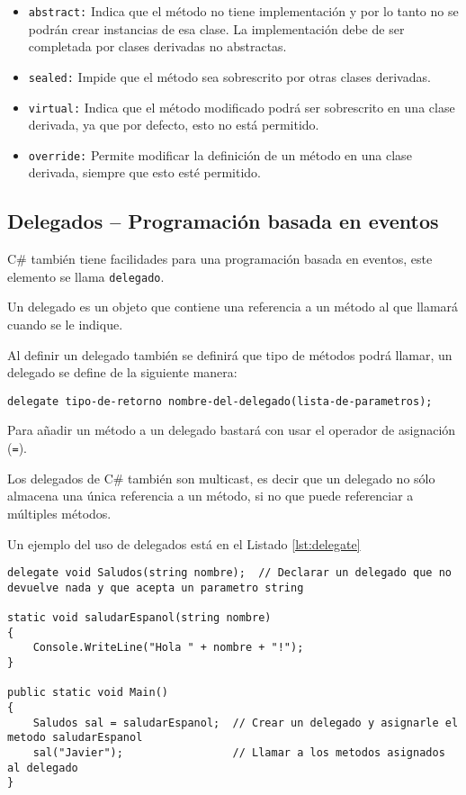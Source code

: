 \documentclass{pre-tfg}
\begin{document}
\begin{itemize}
	\item \texttt{abstract:} Indica que el método no tiene implementación y por lo tanto no se podrán crear instancias de esa clase. La implementación debe de ser completada por clases derivadas no abstractas.
	\item \texttt{sealed:} Impide que el método sea sobrescrito por otras clases derivadas.
	\item \texttt{virtual:} Indica que el método modificado podrá ser sobrescrito en una clase derivada, ya que por defecto, esto no está permitido.
	\item \texttt{override:} Permite modificar la definición de un método en una clase derivada, siempre que esto esté permitido.
\end{itemize}



\subsection{Delegados -- Programación basada en eventos}

C\# también tiene facilidades para una programación basada en eventos, este elemento se llama \texttt{delegado}.

Un delegado es un objeto que contiene una referencia a un método al que llamará cuando se le indique.

Al definir un delegado también se definirá que tipo de métodos podrá llamar, un delegado se define de la siguiente manera:

\begin{spacing}{1}
\begin{lstlisting}[float=htbp, caption=Estructura de un delegado]
delegate tipo-de-retorno nombre-del-delegado(lista-de-parametros);
\end{lstlisting}
\end{spacing}

Para añadir un método a un delegado bastará con usar el operador de asignación (\texttt{=}).

Los delegados de C\# también son multicast, es decir que un delegado no sólo almacena una única referencia a un método, si no que puede referenciar a múltiples métodos.

Un ejemplo del uso de delegados está en el Listado \ref{lst:delegate}

\begin{spacing}{1}
\begin{lstlisting}[float=htbp, caption={Ejemplo de uso de delegados unicast}, label=lst:delegate]
delegate void Saludos(string nombre);  // Declarar un delegado que no devuelve nada y que acepta un parametro string

static void saludarEspanol(string nombre)
{
	Console.WriteLine("Hola " + nombre + "!");
}

public static void Main()
{
	Saludos sal = saludarEspanol;  // Crear un delegado y asignarle el metodo saludarEspanol
	sal("Javier");                 // Llamar a los metodos asignados al delegado
}
\end{lstlisting}
\end{spacing}
\end{document}
